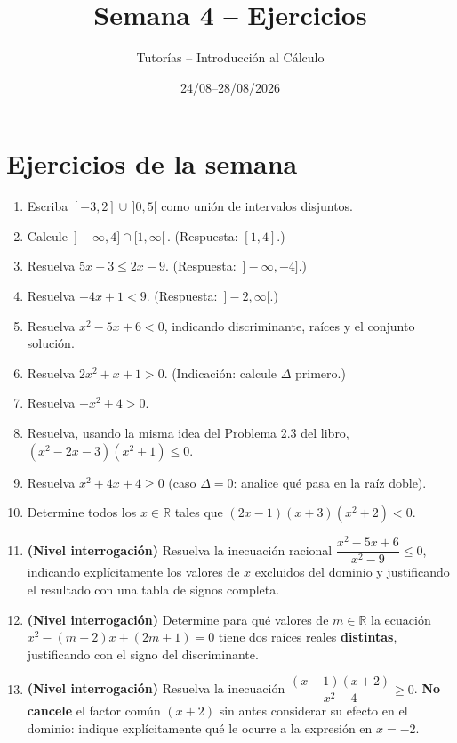 \documentclass[11pt]{article}
\title{Semana 4 -- Ejercicios}
\author{Tutorías -- Introducción al Cálculo}
\date{24/08--28/08/2026}
\begin{document}
\maketitle

\section{Ejercicios de la semana}

\begin{enumerate}[label=\arabic*.]
  \item Escriba $[-3,2] \cup \,]0,5[$ como unión de intervalos disjuntos.

  \item Calcule $\,]-\infty,4] \cap [1,\infty[\,$. (Respuesta: $[1,4]$.)

  \item Resuelva $5x+3 \le 2x-9$. (Respuesta: $\,]-\infty,-4]$.)

  \item Resuelva $-4x+1<9$. (Respuesta: $\,]-2,\infty[$.)

  \item Resuelva $x^2-5x+6<0$, indicando discriminante, raíces y el conjunto solución.

  \item Resuelva $2x^2+x+1>0$. (Indicación: calcule $\Delta$ primero.)

  \item Resuelva $-x^2+4>0$.

  \item Resuelva, usando la misma idea del Problema 2.3 del libro,
  $(x^2-2x-3)(x^2+1) \le 0$.

  \item Resuelva $x^2+4x+4 \ge 0$ (caso $\Delta=0$: analice qué pasa en la raíz doble).

  \item Determine todos los $x\in\mathbb{R}$ tales que $(2x-1)(x+3)(x^2+2)<0$.

  \item \textbf{(Nivel interrogación)} Resuelva la inecuación racional
  $\dfrac{x^2-5x+6}{x^2-9} \le 0$, indicando explícitamente los valores de $x$ excluidos del
  dominio y justificando el resultado con una tabla de signos completa.

  \item \textbf{(Nivel interrogación)} Determine para qué valores de $m\in\mathbb{R}$ la ecuación
  $x^2 - (m+2)x + (2m+1) = 0$ tiene dos raíces reales \textbf{distintas}, justificando con el
  signo del discriminante.

  \item \textbf{(Nivel interrogación)} Resuelva la inecuación
  $\dfrac{(x-1)(x+2)}{x^2-4} \ge 0$. \textbf{No cancele} el factor común $(x+2)$ sin antes
  considerar su efecto en el dominio: indique explícitamente qué le ocurre a la expresión en
  $x=-2$.
\end{enumerate}
\end{document}
